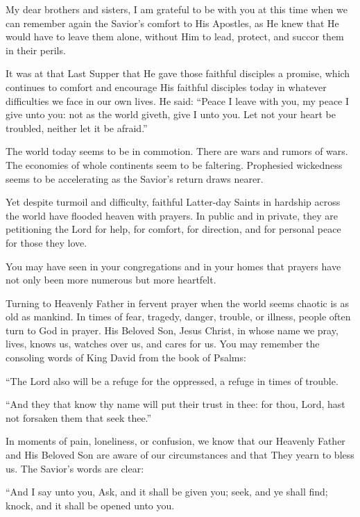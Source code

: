 \documentclass[letterpaper, 11pt]{report}
\newcommand{\speaker}{}
\newcommand{\talk}{}
\newcommand{\talkdatestr}{}
\newcommand{\setspeaker}[1]{\renewcommand{\speaker}{#1}}
\newcommand{\settalk}[1]{\renewcommand{\talk}{#1}}
\newcommand{\talkheading}[2]{%
    \vspace{1em}
    \noindent{\huge\bfseries #1}
    \par\nopagebreak\vspace{0.25em}
    \noindent{\normalsize\bfseries #2\ifx\talkdatestr\empty\else,\ \talkdatestr\fi}
    \par\nopagebreak\vspace{0.5em}
}
\begin{document}
\newpage
\settalk{Prayers for Peace}
\setspeaker{Henry B. Eyring}
\talkheading{Prayers for Peace}{Henry B. Eyring}

My dear brothers and sisters, I am grateful to be with you at this time when we can remember again the Savior’s comfort to His Apostles, as He knew that He would have to leave them alone, without Him to lead, protect, and succor them in their perils.

It was at that Last Supper that He gave those faithful disciples a promise, which continues to comfort and encourage His faithful disciples today in whatever difficulties we face in our own lives. He said: “Peace I leave with you, my peace I give unto you: not as the world giveth, give I unto you. Let not your heart be troubled, neither let it be afraid.”

The world today seems to be in commotion. There are wars and rumors of wars. The economies of whole continents seem to be faltering. Prophesied wickedness seems to be accelerating as the Savior’s return draws nearer.

Yet despite turmoil and difficulty, faithful Latter-day Saints in hardship across the world have flooded heaven with prayers. In public and in private, they are petitioning the Lord for help, for comfort, for direction, and for personal peace for those they love.

You may have seen in your congregations and in your homes that prayers have not only been more numerous but more heartfelt.

Turning to Heavenly Father in fervent prayer when the world seems chaotic is as old as mankind. In times of fear, tragedy, danger, trouble, or illness, people often turn to God in prayer. His Beloved Son, Jesus Christ, in whose name we pray, lives, knows us, watches over us, and cares for us. You may remember the consoling words of King David from the book of Psalms:

“The Lord also will be a refuge for the oppressed, a refuge in times of trouble.

“And they that know thy name will put their trust in thee: for thou, Lord, hast not forsaken them that seek thee.”

In moments of pain, loneliness, or confusion, we know that our Heavenly Father and His Beloved Son are aware of our circumstances and that They yearn to bless us. The Savior’s words are clear:

“And I say unto you, Ask, and it shall be given you; seek, and ye shall find; knock, and it shall be opened unto you.
\end{document}
